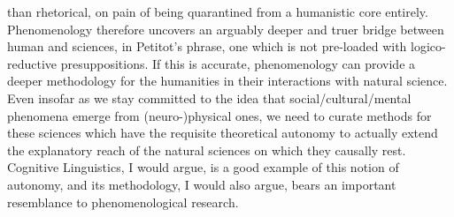 {{than rhetorical, on pain of  being quarantined
from a humanistic core entirely.
}
Phenomenology therefore uncovers
an arguably deeper and truer bridge between human and  sciences,
in Petitot's phrase, one which is not pre-loaded with logico-reductive presuppositions.
If this is accurate, phenomenology can provide a deeper methodology
for the humanities in their interactions with natural science.
Even insofar as we stay committed to the idea
that social/cultural/mental phenomena emerge from (neuro-)physical ones, we
need to curate methods for these  sciences which have the requisite
theoretical autonomy to actually extend the explanatory reach of the natural
sciences on which they causally rest.  Cognitive Linguistics, I would argue,
is a good example of this notion of autonomy, and its methodology, I would
also argue, bears an important resemblance to phenomenological research.
}
